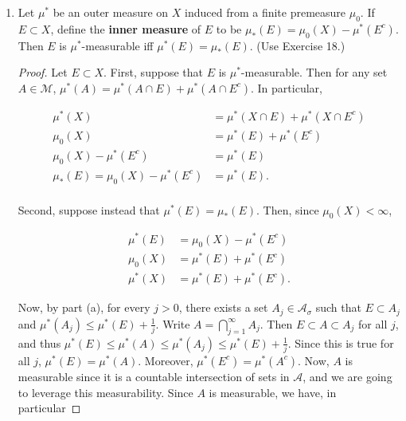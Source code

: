 \documentclass[11pt,oneside,english]{amsart}
\theoremstyle{definition}
\newcommand{\MC}[1]{\mathcal{#1}}
\begin{document}
\begin{enumerate}
\begin{enumerate}
\begin{proof}
%
%
%
%


\end{proof}

\end{enumerate}

\pagebreak


\item Let $\mu^*$ be an outer measure on $X$ induced from a finite premeasure $\mu_0$. If $E\subset X$, define the \textbf{inner measure} of $E$ to be $\mu_*(E)=\mu_0(X)-\mu^*(E^c)$. Then $E$ is $\mu^*$-measurable iff $\mu^*(E)=\mu_*(E)$. (Use Exercise 18.)

\begin{proof}



Let $E\subset X$. First, suppose that $E$ is $\mu^*$-measurable. Then for any set $A\in\MC{M}$, $\mu^*(A)=\mu^*(A\cap E)+\mu^*(A\cap E^c)$. In particular,

\begin{align*}
\mu^*(X)&=\mu^*(X\cap E)+\mu^*(X\cap E^c)\\[2mm]
\mu_0(X)&=\mu^*(E)+\mu^*(E^c)\\[2mm]
\mu_0(X)-\mu^*(E^c)&=\mu^*(E)\\[2mm]
\mu_*(E)=\mu_0(X)-\mu^*(E^c)&=\mu^*(E).\\[2mm]
\end{align*}


Second, suppose instead that $\mu^*(E)=\mu_*(E)$. Then, since $\mu_0(X)<\infty$,

\begin{align*}
\mu^*(E)&=\mu_0(X)-\mu^*(E^c)\\[2mm]
\mu_0(X)&=\mu^*(E)+\mu^*(E^c)\\[2mm]
\mu^*(X)&=\mu^*(E)+\mu^*(E^c).
\end{align*}

Now, by part (a), for every $j>0$, there exists a set $A_j\in\MC{A}_\sigma$ such that $E\subset A_j$ and $\mu^*(A_j)\leq\mu^*(E)+\frac{1}{j}$. Write $A=\bigcap_{j=1}^\infty A_j$. Then $E\subset A\subset A_j$ for all $j$, and thus $\mu^*(E)\leq\mu^*(A)\leq\mu^*(A_j)\leq\mu^*(E)+\frac{1}{j}$. Since this is true for all $j$, $\mu^*(E)=\mu^*(A)$. Moreover, $\mu^*(E^c)=\mu^*(A^c)$. Now, $A$ is measurable since it is a countable intersection of sets in $\MC{A}$, and we are going to leverage this measurability. Since $A$ is measurable, we have, in particular


\end{proof}
\end{enumerate}
\end{document}
